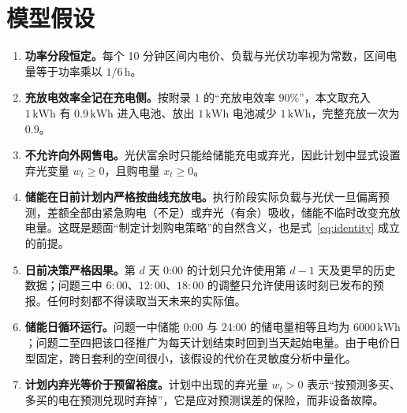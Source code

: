 \section{模型假设}

\begin{enumerate}
  \item \textbf{功率分段恒定。}每个 10 分钟区间内电价、负载与光伏功率视为常数，区间电量等于功率乘以 $1/6\,\mathrm{h}$。
  \item \textbf{充放电效率全记在充电侧。}按附录 1 的“充放电效率 $90\%$”，本文取充入 $1\,\mathrm{kWh}$ 有 $0.9\,\mathrm{kWh}$ 进入电池、放出 $1\,\mathrm{kWh}$ 电池减少 $1\,\mathrm{kWh}$，完整充放一次为 $0.9$。
  \item \textbf{不允许向外网售电。}光伏富余时只能给储能充电或弃光，因此计划中显式设置弃光变量 $w_t\ge0$，且购电量 $x_t\ge0$。
  \item \textbf{储能在日前计划内严格按曲线充放电。}执行阶段实际负载与光伏一旦偏离预测，差额全部由紧急购电（不足）或弃光（有余）吸收，储能不临时改变充放电量。这既是题面“制定计划购电策略”的自然含义，也是式~\eqref{eq:identity} 成立的前提。
  \item \textbf{日前决策严格因果。}第 $d$ 天 0:00 的计划只允许使用第 $d-1$ 天及更早的历史数据；问题三中 $6{:}00$、$12{:}00$、$18{:}00$ 的调整只允许使用该时刻已发布的预报。任何时刻都不得读取当天未来的实际值。
  \item \textbf{储能日循环运行。}问题一中储能 0:00 与 24:00 的储电量相等且均为 $6000\,\mathrm{kWh}$；问题二至四把该口径推广为每天计划结束时回到当天起始电量。由于电价日型固定，跨日套利的空间很小，该假设的代价在灵敏度分析中量化。
  \item \textbf{计划内弃光等价于预留裕度。}计划中出现的弃光量 $w_t>0$ 表示“按预测多买、多买的电在预测兑现时弃掉”，它是应对预测误差的保险，而非设备故障。
\end{enumerate}
